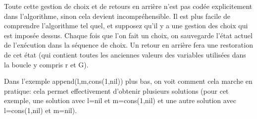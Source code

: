 Toute cette gestion de choix et de retours en arrière n'est pas codée explicitement dans l'algorithme, sinon cela devient incompréhensible. Il est plus facile de comprendre l'algorithme tel quel, et supposez qu'il y a une gestion des choix qui est imposée dessus. Chaque fois que l'on fait un choix, on sauvegarde l'état actuel de l'exécution dans la séquence de choix. Un retour en arrière fera une restoration de cet état (qui contient toutes les anciennes valeurs des variables utilisées dans la boucle y compris r et G).


Dans l'exemple append(l,m,cons(1,nil)) plus bas, on voit comment cela marche en pratique: cela permet effectivement d'obtenir plusieurs solutions (pour cet exemple, une solution avec l=nil et m=cons(1,nil) et une autre solution avec l=cons(1,nil) et m=nil).
